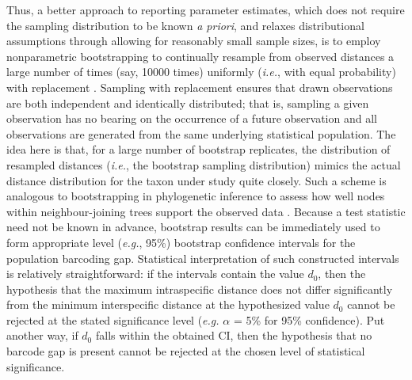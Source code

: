 Thus, a better approach to reporting parameter estimates, which does not require the sampling distribution to be known \textit{a priori}, and relaxes distributional assumptions through allowing for reasonably small sample sizes, is to employ nonparametric bootstrapping to continually resample from observed distances a large number of times (say, 10000 times) uniformly (\textit{i.e.}, with equal probability) with replacement \cite{efron1979boot}. Sampling with replacement ensures that drawn observations are both independent and identically distributed; that is, sampling a given observation has no bearing on the occurrence of a future observation and all observations are generated from the same underlying statistical population. The idea here is that, for a large number of bootstrap replicates, the distribution of resampled distances (\textit{i.e.}, the bootstrap sampling distribution) mimics the actual distance distribution for the taxon under study quite closely. Such a scheme is analogous to bootstrapping in phylogenetic inference to assess how well nodes within neighbour-joining trees support the observed data \cite{felenstein1985confidence, efron1996bootstrap}. Because a test statistic need not be known in advance, bootstrap results can be immediately used to form appropriate level (\textit{e.g.}, 95\%) bootstrap confidence intervals for the population barcoding gap. Statistical interpretation of such constructed intervals is relatively straightforward: if the intervals contain the value $d_0$, then the \\ hypothesis that the maximum intraspecific distance does not differ significantly from the minimum interspecific distance at the hypothesized value $d_0$ cannot be rejected at the stated significance level (\textit{e.g.} $\alpha$ = 5\% for 95\% confidence). Put another way, if $d_0$ falls within the obtained CI, then the hypothesis that no barcode gap is present cannot be rejected at the chosen level of statistical significance. 



